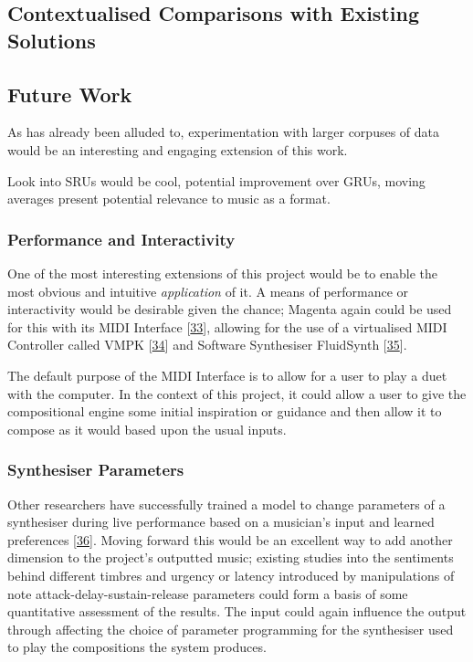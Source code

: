 \documentclass[12pt,]{article}
\begin{document}
\hypertarget{contextualised-comparisons-with-existing-solutions}{%
\subsection{Contextualised Comparisons with Existing
Solutions}\label{contextualised-comparisons-with-existing-solutions}}

\hypertarget{future-work}{%
\subsection{Future Work}\label{future-work}}

As has already been alluded to, experimentation with larger corpuses of
data would be an interesting and engaging extension of this work.

Look into SRUs would be cool, potential improvement over GRUs, moving
averages present potential relevance to music as a format.

\hypertarget{performance-and-interactivity}{%
\subsubsection{Performance and
Interactivity}\label{performance-and-interactivity}}

One of the most interesting extensions of this project would be to
enable the most obvious and intuitive \emph{application} of it. A means
of performance or interactivity would be desirable given the chance;
Magenta again could be used for this with its MIDI Interface
{[}\protect\hyperlink{ref-magentamidi}{33}{]}, allowing for the use of a
virtualised MIDI Controller called VMPK
{[}\protect\hyperlink{ref-vmpk}{34}{]} and Software Synthesiser
FluidSynth {[}\protect\hyperlink{ref-fluidsynth}{35}{]}.

The default purpose of the MIDI Interface is to allow for a user to play
a duet with the computer. In the context of this project, it could allow
a user to give the compositional engine some initial inspiration or
guidance and then allow it to compose as it would based upon the usual
inputs.

\hypertarget{synthesiser-parameters}{%
\subsubsection{Synthesiser Parameters}\label{synthesiser-parameters}}

Other researchers have successfully trained a model to change parameters
of a synthesiser during live performance based on a musician's input and
learned preferences {[}\protect\hyperlink{ref-sommer2014towards}{36}{]}.
Moving forward this would be an excellent way to add another dimension
to the project's outputted music; existing studies into the sentiments
behind different timbres and urgency or latency introduced by
manipulations of note attack-delay-sustain-release parameters could form
a basis of some quantitative assessment of the results. The input could
again influence the output through affecting the choice of parameter
programming for the synthesiser used to play the compositions the system
produces.
\end{document}
